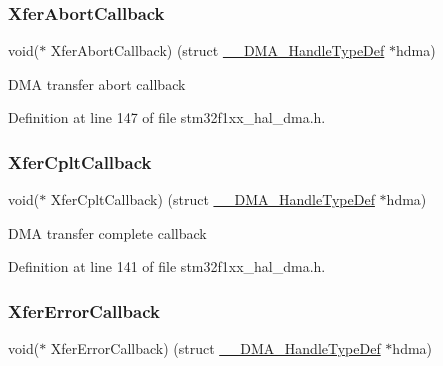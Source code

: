 \subsubsection{\texorpdfstring{Xfer\+Abort\+Callback}{XferAbortCallback}}
{\footnotesize\ttfamily void($\ast$  Xfer\+Abort\+Callback) (struct \hyperlink{struct_____d_m_a___handle_type_def}{\+\_\+\+\_\+\+D\+M\+A\+\_\+\+Handle\+Type\+Def} $\ast$hdma)}

D\+MA transfer abort callback 

Definition at line 147 of file stm32f1xx\+\_\+hal\+\_\+dma.\+h.

\mbox{\label{struct_____d_m_a___handle_type_def_a62a5dfe04a3c53000f26d741e4a27ab4}} 
\subsubsection{\texorpdfstring{Xfer\+Cplt\+Callback}{XferCpltCallback}}
{\footnotesize\ttfamily void($\ast$  Xfer\+Cplt\+Callback) (struct \hyperlink{struct_____d_m_a___handle_type_def}{\+\_\+\+\_\+\+D\+M\+A\+\_\+\+Handle\+Type\+Def} $\ast$hdma)}

D\+MA transfer complete callback 

Definition at line 141 of file stm32f1xx\+\_\+hal\+\_\+dma.\+h.

\mbox{\label{struct_____d_m_a___handle_type_def_a074ff1d4bf731a9cd85e554f1faec29b}} 
\subsubsection{\texorpdfstring{Xfer\+Error\+Callback}{XferErrorCallback}}
{\footnotesize\ttfamily void($\ast$  Xfer\+Error\+Callback) (struct \hyperlink{struct_____d_m_a___handle_type_def}{\+\_\+\+\_\+\+D\+M\+A\+\_\+\+Handle\+Type\+Def} $\ast$hdma)}


